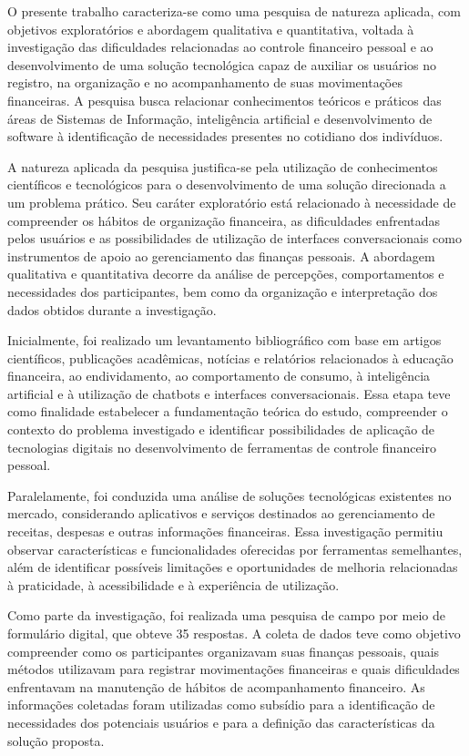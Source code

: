 O presente trabalho caracteriza-se como uma pesquisa de natureza aplicada, com objetivos exploratórios e abordagem qualitativa e quantitativa, voltada à investigação das dificuldades relacionadas ao controle financeiro pessoal e ao desenvolvimento de uma solução tecnológica capaz de auxiliar os usuários no registro, na organização e no acompanhamento de suas movimentações financeiras. A pesquisa busca relacionar conhecimentos teóricos e práticos das áreas de Sistemas de Informação, inteligência artificial e desenvolvimento de software à identificação de necessidades presentes no cotidiano dos indivíduos.

A natureza aplicada da pesquisa justifica-se pela utilização de conhecimentos científicos e tecnológicos para o desenvolvimento de uma solução direcionada a um problema prático. Seu caráter exploratório está relacionado à necessidade de compreender os hábitos de organização financeira, as dificuldades enfrentadas pelos usuários e as possibilidades de utilização de interfaces conversacionais como instrumentos de apoio ao gerenciamento das finanças pessoais. A abordagem qualitativa e quantitativa decorre da análise de percepções, comportamentos e necessidades dos participantes, bem como da organização e interpretação dos dados obtidos durante a investigação.

Inicialmente, foi realizado um levantamento bibliográfico com base em artigos científicos, publicações acadêmicas, notícias e relatórios relacionados à educação financeira, ao endividamento, ao comportamento de consumo, à inteligência artificial e à utilização de chatbots e interfaces conversacionais. Essa etapa teve como finalidade estabelecer a fundamentação teórica do estudo, compreender o contexto do problema investigado e identificar possibilidades de aplicação de tecnologias digitais no desenvolvimento de ferramentas de controle financeiro pessoal.

Paralelamente, foi conduzida uma análise de soluções tecnológicas existentes no mercado, considerando aplicativos e serviços destinados ao gerenciamento de receitas, despesas e outras informações financeiras. Essa investigação permitiu observar características e funcionalidades oferecidas por ferramentas semelhantes, além de identificar possíveis limitações e oportunidades de melhoria relacionadas à praticidade, à acessibilidade e à experiência de utilização.

Como parte da investigação, foi realizada uma pesquisa de campo por meio de formulário digital, que obteve 35 respostas. A coleta de dados teve como objetivo compreender como os participantes organizavam suas finanças pessoais, quais métodos utilizavam para registrar movimentações financeiras e quais dificuldades enfrentavam na manutenção de hábitos de acompanhamento financeiro. As informações coletadas foram utilizadas como subsídio para a identificação de necessidades dos potenciais usuários e para a definição das características da solução proposta.

